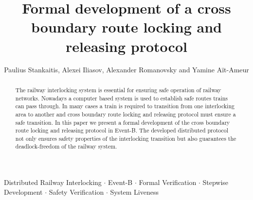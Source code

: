 \documentclass{llncs}
\begin{document}
\title{Formal development of a cross boundary route locking and releasing protocol}


\author{Paulius Stankaitis, Alexei Iliasov,  Alexander Romanovsky and Yamine A\"{i}t-Ameur}


	




  






\date{}

\maketitle



\begin{abstract}
The railway interlocking system is essential for ensuring safe operation of railway networks.  Nowadays a computer based system is used to establish safe routes trains can pass through. In many cases a train is required to transition from one interlocking area to another and cross boundary route locking and releasing protocol must ensure a safe transition. In this paper we present a formal development of the cross boundary route locking and releasing protocol in Event-B. The developed distributed protocol not only ensures safety properties of the interlocking transition but also guarantees the deadlock-freedom of the railway system. %

\end{abstract}

\begin{keywords}
	Distributed Railway Interlocking $\cdot$ Event-B $\cdot$ Formal Verification $\cdot$ Stepwise Development $\cdot$ Safety Verification $\cdot$ System Liveness

\end{keywords}

 \newpage

 \newpage
\end{document}
